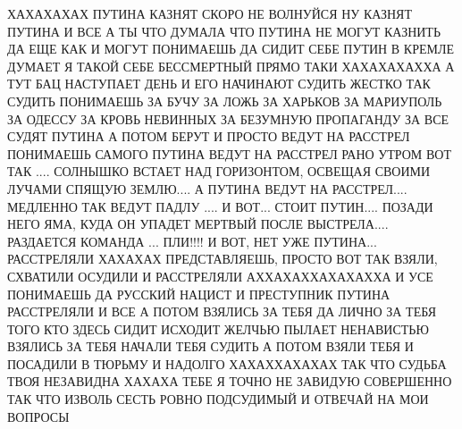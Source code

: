  
 
 
 
 

ХАХАХАХАХ ПУТИНА КАЗНЯТ СКОРО НЕ ВОЛНУЙСЯ НУ КАЗНЯТ ПУТИНА И ВСЕ А ТЫ ЧТО
ДУМАЛА ЧТО ПУТИНА НЕ МОГУТ КАЗНИТЬ ДА ЕЩЕ КАК И МОГУТ ПОНИМАЕШЬ ДА СИДИТ СЕБЕ
ПУТИН В КРЕМЛЕ ДУМАЕТ Я ТАКОЙ СЕБЕ БЕССМЕРТНЫЙ ПРЯМО ТАКИ ХАХАХАХАХХА А ТУТ БАЦ
НАСТУПАЕТ ДЕНЬ И ЕГО НАЧИНАЮТ СУДИТЬ ЖЕСТКО ТАК СУДИТЬ ПОНИМАЕШЬ ЗА БУЧУ ЗА
ЛОЖЬ ЗА ХАРЬКОВ ЗА МАРИУПОЛЬ ЗА ОДЕССУ ЗА КРОВЬ НЕВИННЫХ ЗА БЕЗУМНУЮ ПРОПАГАНДУ
ЗА ВСЕ СУДЯТ ПУТИНА А ПОТОМ БЕРУТ И ПРОСТО ВЕДУТ НА РАССТРЕЛ ПОНИМАЕШЬ САМОГО
ПУТИНА ВЕДУТ НА РАССТРЕЛ РАНО УТРОМ ВОТ ТАК .... СОЛНЫШКО ВСТАЕТ НАД
ГОРИЗОНТОМ, ОСВЕЩАЯ СВОИМИ ЛУЧАМИ СПЯЩУЮ ЗЕМЛЮ.... А ПУТИНА ВЕДУТ НА
РАССТРЕЛ.... МЕДЛЕННО ТАК ВЕДУТ ПАДЛУ .... И ВОТ... СТОИТ ПУТИН.... ПОЗАДИ НЕГО
ЯМА, КУДА ОН УПАДЕТ МЕРТВЫЙ ПОСЛЕ ВЫСТРЕЛА.... РАЗДАЕТСЯ КОМАНДА ... ПЛИ!!!! И
ВОТ, НЕТ УЖЕ ПУТИНА... РАССТРЕЛЯЛИ ХАХАХАХ ПРЕДСТАВЛЯЕШЬ, ПРОСТО ВОТ ТАК ВЗЯЛИ,
СХВАТИЛИ ОСУДИЛИ И РАССТРЕЛЯЛИ АХХАХАХХАХАХАХХА И УСЕ ПОНИМАЕШЬ ДА РУССКИЙ
НАЦИСТ И ПРЕСТУПНИК ПУТИНА РАССТРЕЛЯЛИ И ВСЕ А ПОТОМ ВЗЯЛИСЬ ЗА ТЕБЯ ДА ЛИЧНО
ЗА ТЕБЯ ТОГО КТО ЗДЕСЬ СИДИТ ИСХОДИТ ЖЕЛЧЬЮ ПЫЛАЕТ НЕНАВИСТЬЮ ВЗЯЛИСЬ ЗА ТЕБЯ
НАЧАЛИ ТЕБЯ СУДИТЬ А ПОТОМ ВЗЯЛИ ТЕБЯ И ПОСАДИЛИ В ТЮРЬМУ И НАДОЛГО
ХАХАХХАХАХАХ ТАК ЧТО СУДЬБА ТВОЯ НЕЗАВИДНА ХАХАХА ТЕБЕ Я ТОЧНО НЕ ЗАВИДУЮ
СОВЕРШЕННО ТАК ЧТО ИЗВОЛЬ СЕСТЬ РОВНО ПОДСУДИМЫЙ И ОТВЕЧАЙ НА МОИ ВОПРОСЫ
